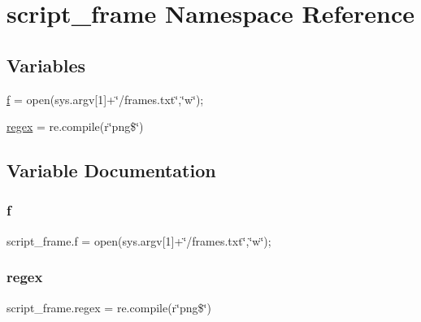 \hypertarget{namespacescript__frame}{}\section{script\+\_\+frame Namespace Reference}
\label{namespacescript__frame}
\subsection*{Variables}
\begin{DoxyCompactItemize}
\item 
\mbox{\hyperlink{namespacescript__frame_aa0452ddfdb9f51ddb995891e30c3d903}{f}} = open(sys.\+argv\mbox{[}1\mbox{]}+\char`\"{}/frames.\+txt\char`\"{},\char`\"{}w\char`\"{});
\item 
\mbox{\hyperlink{namespacescript__frame_a667311914b271021b3f71f96fc67f802}{regex}} = re.\+compile(r\char`\"{}png\$\char`\"{})
\end{DoxyCompactItemize}


\subsection{Variable Documentation}
\mbox{\label{namespacescript__frame_aa0452ddfdb9f51ddb995891e30c3d903}} 
\subsubsection{\texorpdfstring{f}{f}}
{\footnotesize\ttfamily script\+\_\+frame.\+f = open(sys.\+argv\mbox{[}1\mbox{]}+\char`\"{}/frames.\+txt\char`\"{},\char`\"{}w\char`\"{});}

\mbox{\label{namespacescript__frame_a667311914b271021b3f71f96fc67f802}} 
\subsubsection{\texorpdfstring{regex}{regex}}
{\footnotesize\ttfamily script\+\_\+frame.\+regex = re.\+compile(r\char`\"{}png\$\char`\"{})}

